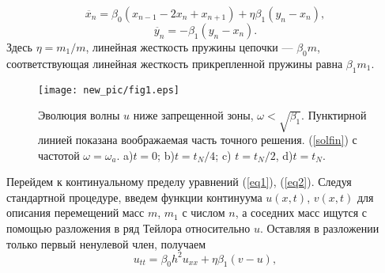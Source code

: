 \begin{equation}
\ddot{x_n}=\beta_0 (x_{n-1}-2x_n+x_{n+1})+\eta \beta_1 (y_n-x_n), 
\label{eq1}
\end{equation}
\begin{equation}
\ddot{y_n}=-\beta_1 (y_n-x_n). \label{eq2}
\end{equation}
Здесь $ \eta = m_1 / m $, линейная жесткость пружины цепочки --- $ \beta_0 m $, соответствующая линейная жесткость прикрепленной пружины равна $ \beta_1 m_1 $. 
\begin{figure*}[h]
\begin{center}
\texttt{[image: new\_pic/fig1.eps]}
\end{center}
\caption{ Эволюция волны $ u $ ниже запрещенной зоны, $\omega<\sqrt{\beta_1}$. Пунктирной линией показана воображаемая часть точного решения. (\ref{solfin}) с частотой $\omega=\omega_a$.  a)$t=0$; b)$ t=t_N/4$; c) $t=t_N/2$, d)$t=t_N$.}
\label{fg1}
  \end{figure*}
Перейдем к континуальному пределу уравнений (\ref {eq1}), (\ref {eq2}). Следуя стандартной процедуре, введем функции континуума $ u(x, t) $, $ v(x, t) $ для описания перемещений масс $ m $, $ m_1 $ с числом $ n $, а  соседних масс ищутся с помощью разложения в ряд Тейлора относительно $ u $. Оставляя в разложении только первый ненулевой член, получаем
\begin{equation}
u_{tt}=\beta_0 h^2 u_{xx}+\eta \beta_1 (v-u), \label{eq3}
\end{equation}
